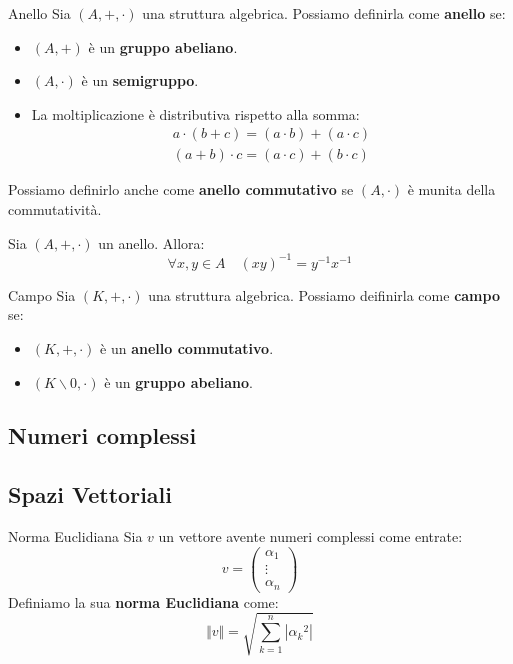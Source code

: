 \begin{definition}{Anello}{}
    Sia $(A,+,\cdot)$ una struttura algebrica. Possiamo definirla come \textbf{anello} se:
    \begin{itemize}
        \item $(A,+)$ è un \textbf{gruppo abeliano}.
        \item $(A,\cdot)$ è un \textbf{semigruppo}.
        \item La moltiplicazione è distributiva rispetto alla somma:
        \begin{equation}
            \begin{split}
                a \cdot (b + c) = (a \cdot b) + (a \cdot c) \\
                (a + b) \cdot c= (a \cdot c) + (b \cdot c)   
            \end{split}
        \end{equation}
    \end{itemize}
    Possiamo definirlo anche come \textbf{anello commutativo} se $(A,\cdot)$ è munita della commutatività.
\end{definition}
\begin{fact}{}{}
    Sia $(A,+,\cdot)$ un anello. Allora:
    \begin{equation}
        \forall x,y\in A \quad (xy)^{-1} = y^{-1}x^{-1}
    \end{equation}
\end{fact}
\begin{definition}{Campo}{}
    Sia $(K,+,\cdot)$ una struttura algebrica. Possiamo deifinirla come \textbf{campo} se:
    \begin{itemize}
        \item $(K,+,\cdot)$ è un \textbf{anello commutativo}.
        \item $(K \backslash 0,\cdot)$ è un \textbf{gruppo abeliano}.
    \end{itemize}
\end{definition}

\subsection{Numeri complessi}
\subsection{Spazi Vettoriali}
\begin{definition}{Norma Euclidiana}{}
    Sia $v$ un vettore avente numeri complessi come entrate:
    \begin{equation}
        v = \left(
        \begin{array}{c}
             \alpha_1  \\
             \vdots \\
            \alpha_n   
        \end{array}\right)
    \end{equation}
    Definiamo la sua \textbf{norma Euclidiana} come:
    \begin{equation}
        \Vert v \Vert = \sqrt{\sum_{k=1}^{n} |{\alpha_k}^2|}
    \end{equation}
\end{definition}
